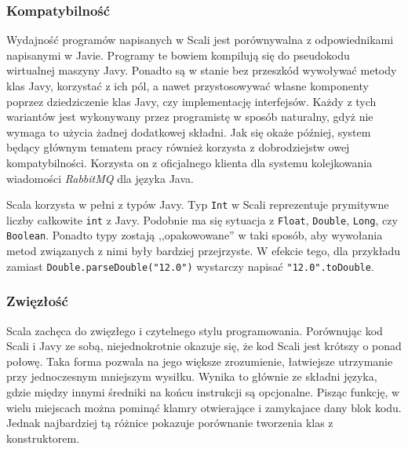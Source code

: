 \documentclass[brudnopis]{xmgr}
\begin{document}
\subsubsection{Kompatybilność}

Wydajność programów napisanych w Scali jest porównywalna z odpowiednikami napisanymi w Javie. Programy te bowiem kompilują się do pseudokodu wirtualnej maszyny Javy. Ponadto są w stanie bez przeszkód wywoływać metody klas Javy, korzystać z ich pól, a nawet przystosowywać własne komponenty poprzez dziedziczenie klas Javy, czy implementację interfejsów. Każdy z tych wariantów jest wykonywany przez programistę w sposób naturalny, gdyż nie wymaga to użycia żadnej dodatkowej składni. Jak się okaże później, system będący głównym tematem pracy również korzysta z dobrodziejstw owej kompatybilności. Korzysta on z oficjalnego klienta dla systemu kolejkowania wiadomości \emph{RabbitMQ} dla języka Java.

Scala korzysta w pełni z typów Javy. Typ \texttt{Int} w Scali reprezentuje prymitywne liczby całkowite \texttt{int} z Javy. Podobnie ma się sytuacja z \texttt{Float}, \texttt{Double}, \texttt{Long}, czy \texttt{Boolean}. Ponadto typy zostają ,,opakowowane'' w taki sposób, aby wywołania metod związanych z nimi były bardziej przejrzyste. W efekcie tego, dla przykładu zamiast \texttt{Double.parseDouble("12.0")} wystarczy napisać \texttt{"12.0".toDouble}.

\subsubsection{Zwięzłość}

Scala zachęca do zwięzłego i czytelnego stylu programowania. Porównując kod Scali i Javy ze sobą, niejednokrotnie okazuje się, że kod Scali jest krótszy o ponad połowę. Taka forma pozwala na jego większe zrozumienie, łatwiejsze utrzymanie przy jednoczesnym mniejszym wysiłku. Wynika to głównie ze składni języka, gdzie między innymi średniki na końcu instrukcji są opcjonalne. Pisząc funkcję, w wielu miejscach można pominąć klamry otwierające i zamykajace dany blok kodu. Jednak najbardziej tą różnice pokazuje porównanie tworzenia klas z konstruktorem.

\inputminted[fontsize=\small,label=Person.java,frame=single,framerule=0pt,framesep=2pt]{java}{code/person.java}

\inputminted[fontsize=\small,label=Person.scala,frame=single,framerule=0pt,framesep=2pt]{scala}{code/person.scala}
\end{document}
